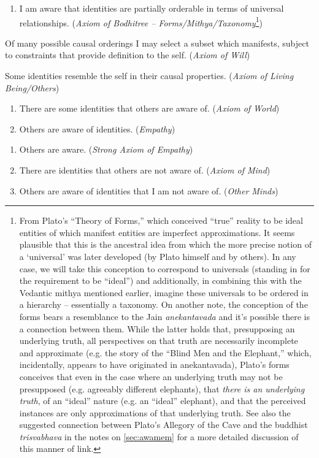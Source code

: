 \documentclass[pra,twocolumn,groupedaddress,10pt]{revtex4}
\theoremstyle{definition}
\begin{document}
\begin{enumerate}[label={[\textbf{\arabic*}]},start=0]
\begin{enumerate}
			\item I am aware that identities are partially orderable in terms of universal relationships. (\emph{Axiom of Bodhitree -- Forms/Mithya/Taxonomy}\footnote{From Plato's ``Theory of Forms,'' which conceived ``true'' reality to be ideal entities of which manifest entities are imperfect approximations. It seems plausible that this is the ancestral idea from which the more precise notion of a `universal' was later developed (by Plato himself and by others). In any case, we will take this conception to correspond to universals (standing in for the requirement to be ``ideal'') and additionally, in combining this with the Vedantic mithya mentioned earlier, imagine these universals to be ordered in a hierarchy -- essentially a taxonomy. On another note, the conception of the forms bears a resemblance to the Jain \emph{anekantavada} and it's possible there is a connection between them. While the latter holds that, presupposing an underlying truth, all perspectives on that truth are necessarily incomplete and approximate (e.g. the story of the ``Blind Men and the Elephant,'' which, incidentally, appears to have originated in anekantavada), Plato's forms conceives that even in the case where an underlying truth may not be presupposed (e.g. agreeably different elephants), that \emph{there is an underlying truth}, of an ``ideal'' nature (e.g. an ``ideal'' elephant), and that the perceived instances are only approximations of that underlying truth. See also the suggested connection between Plato's Allegory of the Cave and the buddhist \emph{trisvabhava} in the notes on \autoref{sec:awamem} for a more detailed discussion of this manner of link.})
		\end{enumerate}
	\item Of many possible causal orderings I may select a subset which manifests, subject to constraints that provide definition to the self. (\emph{Axiom of Will})
	\item Some identities resemble the self in their causal properties. (\emph{Axiom of Living Being/Others})
	\item \begin{enumerate}
			\item There are some identities that others are aware of. (\emph{Axiom of World})
			\item Others are aware of identities. (\emph{Empathy})
		\end{enumerate}
	\item \begin{enumerate}
			\item Others are aware. (\emph{Strong Axiom of Empathy})
			\item There are identities that others are not aware of. (\emph{Axiom of Mind})
			\item Others are aware of identities that I am not aware of. (\emph{Other Minds})
		\end{enumerate}
\end{enumerate}
\end{document}
